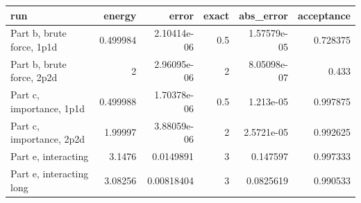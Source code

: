 \begin{tabular}{lrrrrr}
\toprule
run & energy & error & exact & abs_error & acceptance \\
\midrule
Part b, brute force, 1p1d & 0.499984 & 2.10414e-06 & 0.5 & 1.57579e-05 & 0.728375 \\
Part b, brute force, 2p2d & 2 & 2.96095e-06 & 2 & 8.05098e-07 & 0.433 \\
Part c, importance, 1p1d & 0.499988 & 1.70378e-06 & 0.5 & 1.213e-05 & 0.997875 \\
Part c, importance, 2p2d & 1.99997 & 3.88059e-06 & 2 & 2.5721e-05 & 0.992625 \\
Part e, interacting & 3.1476 & 0.0149891 & 3 & 0.147597 & 0.997333 \\
Part e, interacting long & 3.08256 & 0.00818404 & 3 & 0.0825619 & 0.990533 \\
\bottomrule
\end{tabular}
